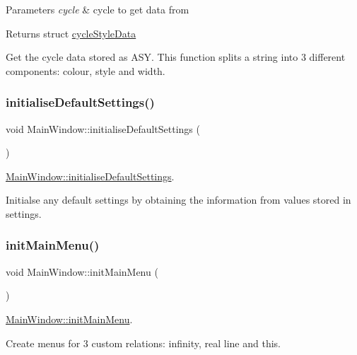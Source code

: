 \begin{DoxyParams}{Parameters}
{\em cycle} & cycle to get data from \\
\hline
\end{DoxyParams}
\begin{DoxyReturn}{Returns}
struct \mbox{\hyperlink{structcycle_style_data}{cycle\+Style\+Data}}
\end{DoxyReturn}
Get the cycle data stored as A\+SY. This function splits a string into 3 different components\+: colour, style and width. \mbox{\label{class_main_window_a72e9fc361f05240f439fb17ff78a40cc}} 
\subsubsection{\texorpdfstring{initialise\+Default\+Settings()}{initialiseDefaultSettings()}}
{\footnotesize\ttfamily void Main\+Window\+::initialise\+Default\+Settings (\begin{DoxyParamCaption}{ }\end{DoxyParamCaption})}



\mbox{\hyperlink{class_main_window_a72e9fc361f05240f439fb17ff78a40cc}{Main\+Window\+::initialise\+Default\+Settings}}. 

Initialse any default settings by obtaining the information from values stored in settings. \mbox{\label{class_main_window_ae78352e402084a7c6518e97056070677}} 
\subsubsection{\texorpdfstring{init\+Main\+Menu()}{initMainMenu()}}
{\footnotesize\ttfamily void Main\+Window\+::init\+Main\+Menu (\begin{DoxyParamCaption}{ }\end{DoxyParamCaption})}



\mbox{\hyperlink{class_main_window_ae78352e402084a7c6518e97056070677}{Main\+Window\+::init\+Main\+Menu}}. 

Create menus for 3 custom relations\+: infinity, real line and this. \mbox{\label{class_main_window_a3e45090789e16c49079857ab0617b239}} 

